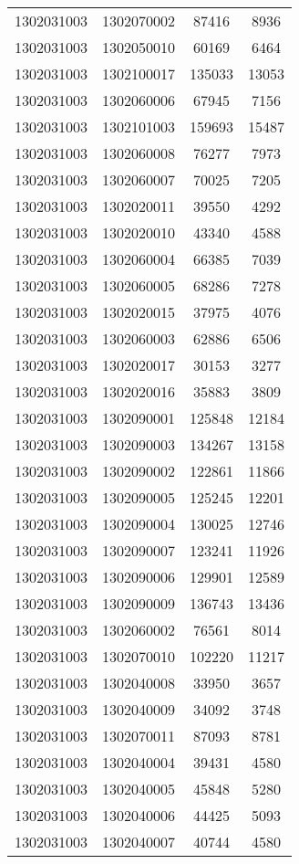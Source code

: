 \begin{longtable}[h]{llcc}
		1302031003 & 1302070002 & 87416 & 8936\\
		1302031003 & 1302050010 & 60169 & 6464\\
		1302031003 & 1302100017 & 135033 & 13053\\
		1302031003 & 1302060006 & 67945 & 7156\\
		1302031003 & 1302101003 & 159693 & 15487\\
		1302031003 & 1302060008 & 76277 & 7973\\
		1302031003 & 1302060007 & 70025 & 7205\\
		1302031003 & 1302020011 & 39550 & 4292\\
		1302031003 & 1302020010 & 43340 & 4588\\
		1302031003 & 1302060004 & 66385 & 7039\\
		1302031003 & 1302060005 & 68286 & 7278\\
		1302031003 & 1302020015 & 37975 & 4076\\
		1302031003 & 1302060003 & 62886 & 6506\\
		1302031003 & 1302020017 & 30153 & 3277\\
		1302031003 & 1302020016 & 35883 & 3809\\
		1302031003 & 1302090001 & 125848 & 12184\\
		1302031003 & 1302090003 & 134267 & 13158\\
		1302031003 & 1302090002 & 122861 & 11866\\
		1302031003 & 1302090005 & 125245 & 12201\\
		1302031003 & 1302090004 & 130025 & 12746\\
		1302031003 & 1302090007 & 123241 & 11926\\
		1302031003 & 1302090006 & 129901 & 12589\\
		1302031003 & 1302090009 & 136743 & 13436\\
		1302031003 & 1302060002 & 76561 & 8014\\
		1302031003 & 1302070010 & 102220 & 11217\\
		1302031003 & 1302040008 & 33950 & 3657\\
		1302031003 & 1302040009 & 34092 & 3748\\
		1302031003 & 1302070011 & 87093 & 8781\\
		1302031003 & 1302040004 & 39431 & 4580\\
		1302031003 & 1302040005 & 45848 & 5280\\
		1302031003 & 1302040006 & 44425 & 5093\\
		1302031003 & 1302040007 & 40744 & 4580\\

\end{longtable}
